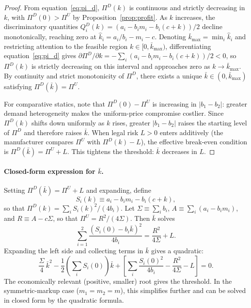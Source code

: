 \documentclass[12pt]{article}
\theoremstyle{definition}
\begin{document}
\begin{proof}
From equation~\eqref{eq:pi_d}, $\Pi^D(k)$ is continuous and strictly decreasing in $k$, with $\Pi^D(0) > \Pi^U$ by Proposition~\ref{prop:profit}.
As $k$ increases, the discriminatory quantities $Q_i^D(k) = (a_i - b_i m_i - b_i(c+k))/2$ decline monotonically, reaching zero at $\hat{k}_i = a_i/b_i - m_i - c$. Denoting $\bar{k}_{\max} = \min_i \hat{k}_i$ and restricting attention to the feasible region $k \in [0, \bar{k}_{\max})$, differentiating equation~\ref{eq:pi_d} gives $\partial \Pi^D/\partial k = -\sum_i (a_i - b_i m_i - b_i(c+k))/2 < 0$, so $\Pi^D(k)$ is strictly decreasing on this interval and approaches zero as $k \to \bar{k}_{\max}$.
By continuity and strict monotonicity of $\Pi^D$, there exists a unique $\bar{k} \in (0, \bar{k}_{\max})$ satisfying $\Pi^D(\bar{k}) = \Pi^U$.

For comparative statics, note that $\Pi^D(0) - \Pi^U$ is increasing in $|b_1 - b_2|$: greater demand heterogeneity makes the uniform-price compromise costlier. Since $\Pi^D(k)$ shifts down uniformly as $k$ rises, greater $|b_1 - b_2|$ raises the starting level of $\Pi^D$ and therefore raises $\bar{k}$.
When legal risk $L > 0$ enters additively (the manufacturer compares $\Pi^U$ with $\Pi^D(k) - L$), the effective break-even condition is $\Pi^D(\bar{k}) = \Pi^U + L$. This tightens the threshold: $\bar{k}$ decreases in $L$.
\end{proof}

\paragraph{Closed-form expression for $\bar{k}$.}
Setting $\Pi^D(\bar{k}) = \Pi^U + L$ and expanding, define
\[
S_i(k) \equiv a_i - b_i m_i - b_i(c+k),
\]
so that $\Pi^D(k) = \sum_i S_i(k)^2/(4b_i)$.
Let $\Sigma \equiv \sum_i b_i$, $A \equiv \sum_i(a_i - b_im_i)$, and $R \equiv A - c\Sigma$, so that $\Pi^U = R^2/(4\Sigma)$.
Then $\bar{k}$ solves
\begin{equation}\label{eq:kbar_solve}
\sum_{i=1}^{2}\frac{(S_i(0) - b_i\bar{k})^2}{4b_i} = \frac{R^2}{4\Sigma} + L.
\end{equation}
Expanding the left side and collecting terms in $\bar{k}$ gives a quadratic:
\begin{equation}\label{eq:kbar_quadratic}
\frac{\Sigma}{4}\,\bar{k}^2 - \frac{1}{2}\!\left(\sum_i S_i(0)\right)\bar{k} + \left[\sum_i \frac{S_i(0)^2}{4b_i} - \frac{R^2}{4\Sigma} - L\right] = 0.
\end{equation}
The economically relevant (positive, smaller) root gives the threshold.
In the symmetric-markup case ($m_1 = m_2 = m$), this simplifies further and can be solved in closed form by the quadratic formula.
\end{document}
